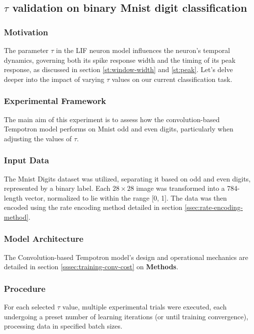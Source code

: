 \subsection{$\tau$ validation on binary Mnist digit classification}

\subsubsection{Motivation}

The parameter $\tau$ in the LIF neuron model influences the neuron's temporal dynamics, governing both its spike response width and the timing of its peak response, as discussed in section \ref{st:window-width} and \ref{st:peak}. 
Let's delve deeper into the impact of varying $\tau$ values on our current classification task.


\subsubsection{Experimental Framework}

The main aim of this experiment is to assess how the convolution-based Tempotron model performs on Mnist odd and even digits, particularly when adjusting the values of $\tau$.

\subsubsection{Input Data}

The Mnist Digits dataset was utilized, separating it based on odd and even digits, represented by a binary label. Each $28 \times 28$ image was transformed into a 784-length vector, normalized to lie within the range [0, 1]. The data was then encoded using the rate encoding method detailed in section \ref{ssec:rate-encoding-method}.


\subsubsection{Model Architecture}

The Convolution-based Tempotron model's design and operational mechanics are detailed in section \ref{sssec:training-conv-cost} on \textbf{Methods}.


\subsubsection{Procedure}

For each selected $\tau$ value, multiple experimental trials were executed, each undergoing a preset number of learning iterations (or until training convergence), processing data in specified batch sizes.

